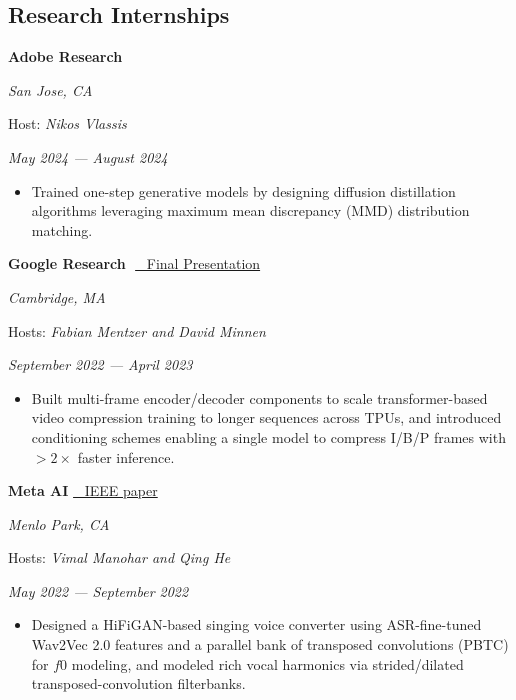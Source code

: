 \documentclass[10pt,margin,centered]{res}
\newcommand\quelle[1]{{%
      \unskip\nobreak\hfil\penalty50
      \hbox{}\nobreak\hfil\emph{#1}%
      \parfillskip=0pt \finalhyphendemerits=0 \par}}
\begin{document}
\begin{resume}

\newcommand{\vspone}{\vspace{-1mm}}
\section{\sc Research Internships}
{\bf Adobe Research} \quelle{San Jose, CA}
\vspace{-4mm}
Host: \textit{Nikos Vlassis} \quelle{May 2024 --- August 2024}
\begin{itemize}
    \item Trained one-step generative models by designing diffusion distillation algorithms leveraging maximum mean discrepancy (MMD) distribution matching.
\end{itemize}
\vspone


{\bf Google Research} \,\,\href{https://docs.google.com/presentation/d/12mXjO50qHUXiuk062CGNG6gNwtfHcO86uYLYbCLQmms/edit?usp=sharing&resourcekey=0-onMp2_GuNQTqEIEbvpB1AA}{\color{blue} \small
\faFilePowerpointO\  Final Presentation}\quelle{Cambridge, MA} 
\vspace{-4mm}
Hosts: \textit{Fabian Mentzer and David Minnen }\quelle{September 2022 --- April 2023}

\begin{itemize}
    \item Built multi-frame encoder/decoder components to scale transformer-based video compression training to longer sequences across TPUs, and introduced conditioning schemes enabling a single model to compress I/B/P frames with $>2\times$ faster inference.
\end{itemize}
\vspone


{\bf Meta AI}\,\,\href{https://ieeexplore.ieee.org/document/10097147}{\color{blue} \small
\faFilePdfO\ IEEE paper}\quelle{Menlo Park, CA}
\vspace{-4mm}
Hosts: \textit{Vimal Manohar and Qing He} \quelle{May 2022 --- September 2022}
\begin{itemize}
    \item Designed a HiFiGAN-based singing voice converter using ASR-fine-tuned Wav2Vec 2.0 features and a parallel bank of transposed convolutions (PBTC) for $f0$ modeling, and modeled rich vocal harmonics via strided/dilated transposed-convolution filterbanks.
\end{itemize}
\vspone



\end{resume}
\end{document}
